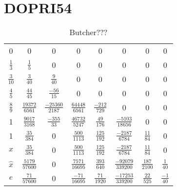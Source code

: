 \section{DOPRI54}




\begin{table}[H]
\centering
\begin{tabular}{c|ccccccc}
0 & 0 & 0 & 0 & 0 & 0 & 0 & 0 \\
$\frac{1}{3}$ & $\frac{1}{5}$ & 0 & 0 & 0 & 0 & 0 & 0 \\
$\frac{3}{10}$ & $\frac{3}{40}$ & $\frac{9}{40}$ & 0 & 0 & 0 & 0 & 0 \\
$\frac{4}{5}$ & $\frac{44}{45}$ & $\frac{-56}{15}$ & 0 & 0 & 0 & 0 & 0 \\
$\frac{8}{9}$ & $\frac{19372}{6561}$ & $\frac{-25360}{2187}$ & $\frac{64448}{6561}$ & $\frac{-212}{729}$ & 0 & 0 & 0 \\
1 & $\frac{9017}{3168}$ & $\frac{-355}{33}$ & $\frac{46732}{5247}$ & $\frac{49}{176}$ & $\frac{-5103}{18656}$ & 0 & 0 \\
1 & $\frac{35}{384}$ & 0 & $\frac{500}{1113}$ & $\frac{125}{192}$ & $\frac{-2187}{6784}$ & $\frac{11}{84}$ & 0 \\ \hline
 $x$ &  $\frac{35}{384}$ & 0 & $\frac{500}{1113}$ & $\frac{125}{192}$ & $\frac{-2187}{6784}$ & $\frac{11}{84}$ & 0  \\
$\hat{x}$ & $\frac{5179}{57600}$ & 0 & $\frac{7571}{16695}$ & $\frac{393}{640}$ & $\frac{-92079}{339200}$ & $\frac{187}{2100}$ & $\frac{1}{40}$ \\ \hline
$e$ & $\frac{71}{57600}$ & 0 & $\frac{-71}{16695}$ & $\frac{71}{1920}$ & $\frac{-17253}{339200}$ & $\frac{22}{525}$ & $\frac{-1}{40}$
\end{tabular}%
\caption{Butcher???}
\end{table}




